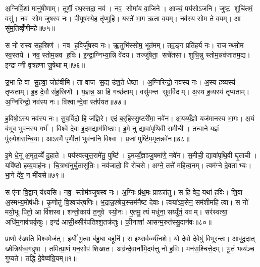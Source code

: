 अ॒ग्निर्वि॒शां मानु॑षीणाम्। तूर्णी॒ रथ॒स्सदा॒ नव॑। नव॒ सोमा॑य वा॒जिने। आज्यं॒ पय॑सोऽजनि। जुष्ट॒ शुचि॑तमं॒ वसु॑। नव सोम जुषस्व नः। पी॒यूष॑स्ये॒ह तृ॑प्णुहि। यस्ते॑ भा॒ग ऋ॒ता व॒यम्। नव॑स्य सोम ते व॒यम्। आ सु॑म॒तिव्वृँ॑णीमहे॥७५॥

स नो॑ रास्व सह॒स्रिण॑। नव ह॒विर्जु॑षस्व नः। ऋ॒तुभि॑स्सोम॒ भूत॑मम्। तद॒ङ्ग प्रति॑हर्य नः। राजन्थ्सोम स्व॒स्तये। नव॒स्तोम॒न्नव ह॒विः। इ॒न्द्रा॒ग्निभ्या॒न्नि वे॑दय। तज्जु॑षेता॒ सचे॑तसा। शुचि॒न्नु स्तोम॒न्नव॑जातम॒द्य। इन्द्राग्नी वृत्रहणा जु॒षेथाम्॥७६॥

उ॒भा हि वा सु॒हवा॒ जोह॑वीमि। ता वाज स॒द्य उ॑श॒ते धेष्ठा। अ॒ग्निरिन्द्रो॒ नव॑स्य नः। अ॒स्य ह॒व्यस्य॑ तृप्यताम्। इ॒ह दे॒वौ स॑ह॒स्रिणौ। य॒ज्ञन्न॒ आ हि गच्छ॑ताम्। वसु॑मन्त सुव॒र्विदम्। अ॒स्य ह॒व्यस्य॑ तृप्यताम्। अ॒ग्निरिन्द्रो॒ नव॑स्य नः। विश्वान्दे॒वास्त॑र्पयत॥७७॥

ह॒विषो॒ऽस्य नव॑स्य नः। सु॒व॒र्विदो॒ हि ज॑ज्ञि॒रे। एदं ब॒र्॒हिस्सु॒ष्टरी॑मा॒ नवे॑न। अ॒यय्यँ॒ज्ञो यज॑मानस्य भा॒गः। अ॒यं ब॑भूव॒ भुव॑नस्य॒ गर्भ॑। विश्वे॑ दे॒वा इ॒दम॒द्याग॑मिष्ठाः। इ॒मे नु द्यावा॑पृथि॒वी स॒मीची। त॒न्वा॒ने य॒ज्ञं पु॑रु॒पेश॑सन्धि॒या। आऽस्मै॑ पृणीतां॒ भुव॑नानि॒ विश्वा। प्र॒जां पुष्टि॑म॒मृत॒न्नवे॑न॥७८॥

इ॒मे धे॒नू अ॒मृत॒य्येँ दु॒हाते। पय॑स्वत्युत्त॒रामे॑तु॒ पुष्टि॑। इ॒मय्यँ॒ज्ञञ्जु॒षमा॑णे॒ नवे॑न। स॒मीची॒ द्यावा॑पृथि॒वी घृ॒ताची। यवि॑ष्ठो हव्य॒वाह॑नः। चि॒त्रभा॑नुर्घु॒तासु॑तिः। नव॑जातो॒ वि रो॑चसे। अग्ने॒ तत्ते॑ महित्व॒नम्। त्वम॑ग्ने दे॒वताभ्यः। भा॒गे दे॑व॒ न मी॑यसे॥७९॥

स ए॑ना वि॒द्वान् य॑क्ष्यसि। नव॒ स्तोम॑ञ्जुषस्व नः। अ॒ग्निः प्र॑थ॒मः प्राश्ञा॑तु। स हि वेद॒ यथा॑ ह॒विः। शि॒वा अ॒स्मभ्य॒मोष॑धीः। कृ॒णोतु॑ वि॒श्वच॑र्‌षणिः। भ॒द्रान्न॒श्श्रेय॒स्सम॑नैष्ट देवाः। त्वया॑ऽव॒सेन॒ सम॑शीमहि त्वा। स नो॑ मयो॒भूः पि॑तो॒ आ वि॑शस्व। शन्तो॒काय॑ त॒नुवे स्यो॒नः। ए॒तमु॒ त्यं मधु॑ना॒ सय्युँ॑तं॒ यवम्। सर॑स्वत्या॒ अधि॑म॒नाव॑चर्कृषुः। इन्द्र॑ आसी॒थ्सीर॑पतिश्श॒तक्र॑तुः। की॒नाशा॑ आसन्म॒रुत॑स्सु॒दान॑वः॥८०॥



\clearpage
{}
\setcounter{anuvakam}{0}
प्रा॒णो र॑ख्षति॒ विश्व॒मेज॑त्। इर्यो॑ भू॒त्वा ब॑हु॒धा ब॒हूनि॑। स इथ्सर्व॒व्व्याँ॑नशे। यो दे॒वो दे॒वेषु॑ वि॒भूर॒न्तः। आवृ॑दू॒दात् ख्षेत्रिय॑ध्व॒गद्वृषा। तमित्प्रा॒णं मन॒सोप॑ शिख्षत। अग्र॑न्दे॒वाना॑मि॒दम॑त्तु नो ह॒विः। मन॑स॒श्चित्ते॒दम्। भू॒तं भव्य॑ञ्च गुप्यते। तद्धि दे॒वेष्व॑ग्रि॒यम्॥१॥

